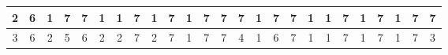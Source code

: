 \begin{sidewaystable}[]
\begin{tabular}{|c|c|c|c|c|c|c|c|c|c|c|c|c|c|c|c|c|c|c|c|c|c|c|c|c|}
    2       & 6                                               & 1                                               & 7                                               & 7                                               & 1                                               & 1                                               & 7                                               & 1                                               & 7                                               & 1                                                & 7                                                & 7                                                & 7                                               & 1                                               & 7                                               & 7                                               & 1                                               & 1                                               & 7                                               & 1                                                 & 7                                               & 1                                                & 7                                                & 7                                                \\ \hline
    3       & 6                                               & 2                                               & 5                                               & 6                                               & 2                                               & 2                                               & 7                                               & 2                                               & 7                                               & 1                                                & 7                                                & 7                                                & 4                                               & 1                                               & 6                                               & 7                                               & 1                                               & 1                                               & 7                                               & 1                                                 & 7                                               & 1                                                & 7                                                & 3                                                \\ \hline

\end{tabular}
\end{sidewaystable}
